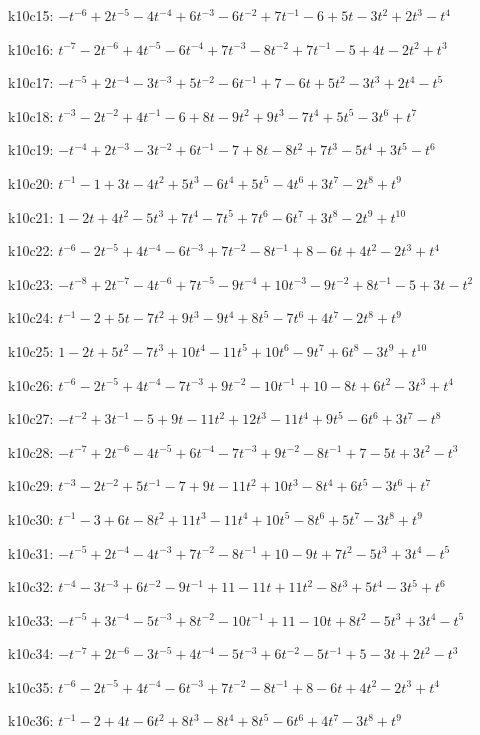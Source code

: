 k10c15: $-t^{-6}+2t^{-5}-4t^{-4}+6t^{-3}-6t^{-2}+7t^{-1}-6+5t-3t^{2}+2t^{3}-t^{4}$

k10c16: $t^{-7}-2t^{-6}+4t^{-5}-6t^{-4}+7t^{-3}-8t^{-2}+7t^{-1}-5+4t-2t^{2}+t^{3}$

k10c17: $-t^{-5}+2t^{-4}-3t^{-3}+5t^{-2}-6t^{-1}+7-6t+5t^{2}-3t^{3}+2t^{4}-t^{5}$

k10c18: $t^{-3}-2t^{-2}+4t^{-1}-6+8t-9t^{2}+9t^{3}-7t^{4}+5t^{5}-3t^{6}+t^{7}$

k10c19: $-t^{-4}+2t^{-3}-3t^{-2}+6t^{-1}-7+8t-8t^{2}+7t^{3}-5t^{4}+3t^{5}-t^{6}$

k10c20: $t^{-1}-1+3t-4t^{2}+5t^{3}-6t^{4}+5t^{5}-4t^{6}+3t^{7}-2t^{8}+t^{9}$

k10c21: $1-2t+4t^{2}-5t^{3}+7t^{4}-7t^{5}+7t^{6}-6t^{7}+3t^{8}-2t^{9}+t^{10}$

k10c22: $t^{-6}-2t^{-5}+4t^{-4}-6t^{-3}+7t^{-2}-8t^{-1}+8-6t+4t^{2}-2t^{3}+t^{4}$

k10c23: $-t^{-8}+2t^{-7}-4t^{-6}+7t^{-5}-9t^{-4}+10t^{-3}-9t^{-2}+8t^{-1}-5+3t-t^{2}$

k10c24: $t^{-1}-2+5t-7t^{2}+9t^{3}-9t^{4}+8t^{5}-7t^{6}+4t^{7}-2t^{8}+t^{9}$

k10c25: $1-2t+5t^{2}-7t^{3}+10t^{4}-11t^{5}+10t^{6}-9t^{7}+6t^{8}-3t^{9}+t^{10}$

k10c26: $t^{-6}-2t^{-5}+4t^{-4}-7t^{-3}+9t^{-2}-10t^{-1}+10-8t+6t^{2}-3t^{3}+t^{4}$

k10c27: $-t^{-2}+3t^{-1}-5+9t-11t^{2}+12t^{3}-11t^{4}+9t^{5}-6t^{6}+3t^{7}-t^{8}$

k10c28: $-t^{-7}+2t^{-6}-4t^{-5}+6t^{-4}-7t^{-3}+9t^{-2}-8t^{-1}+7-5t+3t^{2}-t^{3}$

k10c29: $t^{-3}-2t^{-2}+5t^{-1}-7+9t-11t^{2}+10t^{3}-8t^{4}+6t^{5}-3t^{6}+t^{7}$

k10c30: $t^{-1}-3+6t-8t^{2}+11t^{3}-11t^{4}+10t^{5}-8t^{6}+5t^{7}-3t^{8}+t^{9}$

k10c31: $-t^{-5}+2t^{-4}-4t^{-3}+7t^{-2}-8t^{-1}+10-9t+7t^{2}-5t^{3}+3t^{4}-t^{5}$

k10c32: $t^{-4}-3t^{-3}+6t^{-2}-9t^{-1}+11-11t+11t^{2}-8t^{3}+5t^{4}-3t^{5}+t^{6}$

k10c33: $-t^{-5}+3t^{-4}-5t^{-3}+8t^{-2}-10t^{-1}+11-10t+8t^{2}-5t^{3}+3t^{4}-t^{5}$

k10c34: $-t^{-7}+2t^{-6}-3t^{-5}+4t^{-4}-5t^{-3}+6t^{-2}-5t^{-1}+5-3t+2t^{2}-t^{3}$

k10c35: $t^{-6}-2t^{-5}+4t^{-4}-6t^{-3}+7t^{-2}-8t^{-1}+8-6t+4t^{2}-2t^{3}+t^{4}$

k10c36: $t^{-1}-2+4t-6t^{2}+8t^{3}-8t^{4}+8t^{5}-6t^{6}+4t^{7}-3t^{8}+t^{9}$

